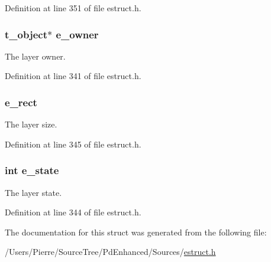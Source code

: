 Definition at line 351 of file estruct.\-h.

\hypertarget{struct__elayer_a2a35e154dc0053b0c8078d322ee1b5e3}{
\subsubsection[{e\-\_\-owner}]{\setlength{\rightskip}{0pt plus 5cm}t\-\_\-object$\ast$ e\-\_\-owner}}\label{struct__elayer_a2a35e154dc0053b0c8078d322ee1b5e3}
The layer owner. 

Definition at line 341 of file estruct.\-h.

\hypertarget{struct__elayer_aaef55281ce06e8d04077acd1e73e484e}{
\subsubsection[{e\-\_\-rect}]{ e\-\_\-rect}}\label{struct__elayer_aaef55281ce06e8d04077acd1e73e484e}
The layer size. 

Definition at line 345 of file estruct.\-h.

\hypertarget{struct__elayer_a6ebb09ffbaedff41ff95d74f7ebdb71b}{
\subsubsection[{e\-\_\-state}]{\setlength{\rightskip}{0pt plus 5cm}int e\-\_\-state}}\label{struct__elayer_a6ebb09ffbaedff41ff95d74f7ebdb71b}
The layer state. 

Definition at line 344 of file estruct.\-h.



The documentation for this struct was generated from the following file\-:\begin{DoxyCompactItemize}
\item 
/\-Users/\-Pierre/\-Source\-Tree/\-Pd\-Enhanced/\-Sources/\hyperlink{estruct_8h}{estruct.\-h}\end{DoxyCompactItemize}

